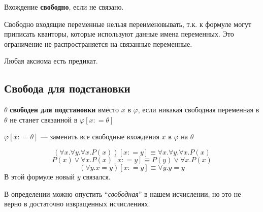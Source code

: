 \begin{definition}
    Вхождение \textbf{свободно}, если не связано.
\end{definition}

\begin{remark}
    Свободно входящие переменные нельзя переименовывать, т.к. к формуле могут приписать кванторы, которые используют данные имена переменных. Это ограничение не распространяется на связанные переменные.
\end{remark}

Любая аксиома есть предикат.

\subsection{Свобода для подстановки}

\begin{definition}
    \(\theta\) \textbf{свободен для подстановки} вместо \(x\) в \(\varphi\), если никакая свободная переменная в \(\theta\) не станет связанной в \(\varphi[x: = \theta]\)
\end{definition}

\begin{obozn}
    \(\varphi[x: = \theta]\) --- заменить все свободные вхождения \(x\) в \(\varphi\) на \(\theta\)
\end{obozn}

\begin{example}
    \[(\forall x.\forall y.\forall x.P(x))[x: = y] \equiv \forall x.\forall y.\forall x.P(x)\]
    \[P(x)\lor \forall x.P(x)[x: = y] \equiv P(y)\lor \forall x.P(x)\]
    \[(\forall y.x = y)[x: = y] \equiv \forall y.y = y\]
    В этой формуле новый \(y\) связался.
\end{example}

\begin{remark}
    В определении можно опустить ``\textit{свободная}'' в нашем исчислении, но это не верно в достаточно извращенных исчислениях.
\end{remark}

